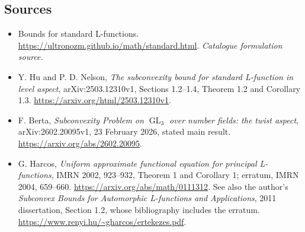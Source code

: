 \documentclass[11pt,a4paper]{article}
\numberwithin{equation}{section}
\begin{document}
\subsection{Sources}
\begin{itemize}\raggedright
\item[\textnormal{[S1]}]\hypertarget{source:30006752:1}{} Bounds for standard L-functions.
\url{https://ultronozm.github.io/math/standard.html}.
{\small\textit{Catalogue formulation source.}}
\item[\textnormal{[E1]}]\hypertarget{extra:30006752:1}{} Y. Hu and P. D. Nelson,
\emph{The subconvexity bound for standard L-function in level aspect},
arXiv:2503.12310v1, Sections 1.2--1.4, Theorem 1.2 and Corollary 1.3.
\url{https://arxiv.org/html/2503.12310v1}.
\item[\textnormal{[E2]}]\hypertarget{extra:30006752:2}{} F. Berta,
\emph{Subconvexity Problem on $\operatorname{GL}_3$ over number fields:
the twist aspect}, arXiv:2602.20095v1, 23 February 2026, stated main result.
\url{https://arxiv.org/abs/2602.20095}.
\item[\textnormal{[E3]}]\hypertarget{extra:30006752:3}{} G. Harcos,
\emph{Uniform approximate functional equation for principal L-functions},
IMRN 2002, 923--932, Theorem 1 and Corollary 1; erratum, IMRN 2004, 659--660.
\url{https://arxiv.org/abs/math/0111312}.
See also the author's \emph{Subconvex Bounds for Automorphic L-functions and
Applications}, 2011 dissertation, Section 1.2, whose bibliography includes
the erratum. \url{https://www.renyi.hu/~gharcos/ertekezes.pdf}.

\end{itemize}
\end{document}
